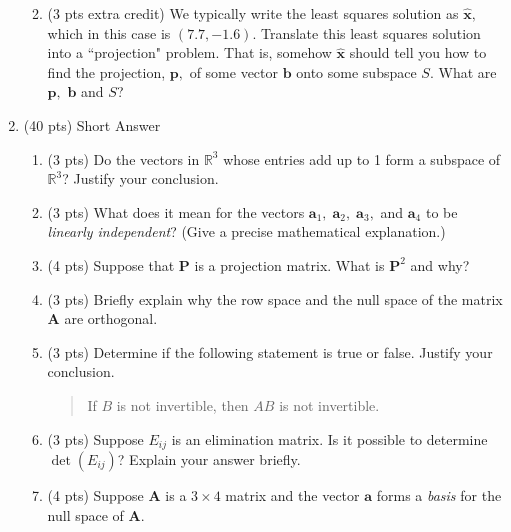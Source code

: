 \documentclass[11pt]{amsart}
\newcommand{\ba}{\mathbf{a}}
\newcommand{\bb}{\mathbf{b}}
\newcommand{\bp}{\mathbf{p}}
\newcommand{\bx}{\mathbf{x}}
\newcommand{\bA}{\mathbf{A}}
\newcommand{\bP}{\mathbf{P}}
\begin{document}
\begin{enumerate}
\begin{enumerate}
	\vfill
	\item (3 pts extra credit) We typically write the least squares solution as $\widehat{\bx},$ which in this case is $(7.7,-1.6).$ Translate this least squares solution into a ``projection" problem. That is, somehow $\widehat{\bx}$ should tell you how to find the projection, $\bp,$ of some vector $\bb$ onto some subspace $S.$ What are $\bp,$ $\bb$ and $S$?
	\vfill
	\end{enumerate}
\item (40 pts) Short Answer
	\begin{enumerate}
	\item (3 pts) Do the vectors in $\mathbb{R}^3$ whose entries add up to 1 form a subspace of $\mathbb{R}^3$? Justify your conclusion.
	\vfill
	\item (3 pts) What does it mean for the vectors $\ba_1, \; \ba_2, \; \ba_3,$ and $\ba_4$ to be \emph{linearly independent}? (Give a precise mathematical explanation.) 
	\vfill
	\newpage
	\item (4 pts) Suppose that $\bP$ is a projection matrix. What is $\bP^2$ and why?
	\vfill
	\item (3 pts) Briefly explain why the row space and the null space of the matrix $\bA$ are orthogonal.
	\vfill
	
	\item (3 pts) Determine if the following statement is true or false. Justify your conclusion.\\
	\begin{quote} If $B$ is not invertible, then $AB$ is not invertible. \end{quote}
	\vfill
	\item (3 pts) Suppose $E_{ij}$ is an elimination matrix. Is it possible to determine $\det(E_{ij})$? Explain your answer briefly.
	\vfill
	\item (4 pts) Suppose $\bA$ is a $3 \times 4$ matrix and the vector $\ba$ forms a \emph{basis} for the null space of $\bA$. 
	\end{enumerate}
\end{enumerate}
\end{document}
